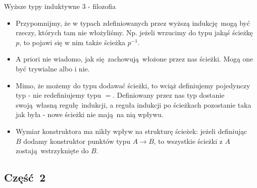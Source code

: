\documentclass{beamer}
\begin{document}
\begin{frame}{Wyższe typy induktywne 3 - filozofia}
\begin{itemize}
	\item Przypomnijmy, że w typach zdefiniowanych przez wyższą indukcję mogą być rzeczy, których tam nie włożyliśmy. Np. jeżeli wrzucimy do typu jakąś ścieżkę $p$, to pojawi się w nim także ścieżka $p^{-1}$.
	\item A priori nie wiadomo, jak się zachowują włożone przez nas ścieżki. Mogą one być trywialne albo i nie.
	\item Mimo, że możemy do typu dodawać ścieżki, to wciąż definiujemy pojedynczy typ - nie redefiniujemy typu $=$. Definiowany przez nas typ dostanie swoją własną regułę indukcji, a reguła indukcji po ścieżkach pozostanie taka jak była - nowe ścieżki nie mają na nią wpływu.
	\item Wymiar konstruktora ma nikły wpływ na strukturę ścieżek: jeżeli definiując $B$ dodamy konstruktor punktów typu $A \to B$, to wszystkie ścieżki z $A$ zostają wstrzyknięte do $B$.
\end{itemize}
\end{frame}

\subsection{Część 2}
\end{document}
